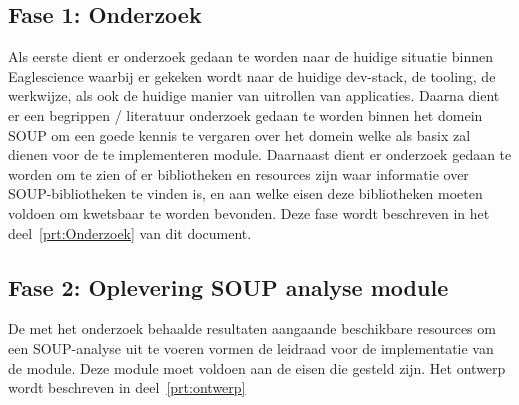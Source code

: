 \subsection{Fase 1: Onderzoek} \label{subsec:fase-1:-onderzoek}
Als eerste dient er onderzoek gedaan te worden naar de huidige situatie binnen Eaglescience waarbij er gekeken wordt naar de huidige dev-stack, de tooling, de werkwijze, als ook de huidige manier van uitrollen van applicaties. Daarna dient er een begrippen / literatuur onderzoek gedaan te worden binnen het domein SOUP om een goede kennis te vergaren over het domein welke als basix zal dienen voor de te implementeren module. Daarnaast dient er onderzoek gedaan te worden om te zien of er bibliotheken en resources zijn waar informatie over SOUP-bibliotheken te vinden is, en aan welke eisen deze bibliotheken moeten voldoen om kwetsbaar te worden bevonden. Deze fase wordt beschreven in het deel~\ref{prt:Onderzoek} van dit document.

\subsection{Fase 2: Oplevering SOUP analyse module}\label{subsec:fase-2:-oplevering-soup-analyse-module}
De met het onderzoek behaalde resultaten aangaande beschikbare resources om een SOUP-analyse uit te voeren vormen de leidraad voor de implementatie van de module. Deze module moet voldoen aan de eisen die gesteld zijn. Het ontwerp wordt beschreven in deel~\ref{prt:ontwerp}

